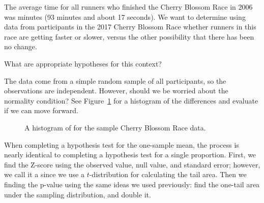 The average time for all runners who finished the Cherry Blossom Race in 2006 was \cherryblossomnull{} minutes (93 minutes and about 17 seconds). We want to determine using data from \cherryblossomn{} participants in the 2017 Cherry Blossom Race whether runners in this race are getting faster or slower, versus the other possibility that there has been no change.

\begin{exercisewrap}
\begin{nexercise}
What are appropriate hypotheses for this context?\footnotemark{}
\end{nexercise}
\end{exercisewrap}

\begin{exercisewrap}
\begin{nexercise}
The data come from a simple random sample of all participants,
so the observations are independent.
However, should we be worried about the normality condition?
See Figure~\ref{run10SampTimeHistogram} for a histogram
of the differences and evaluate if we can move
forward.\footnotemark{}
\end{nexercise}
\end{exercisewrap}

\begin{figure}[h]
  \centering
  \caption{A histogram of  for the sample
      Cherry Blossom Race data.}
  \label{run10SampTimeHistogram}
\end{figure}

When completing a hypothesis test for the one-sample mean,
the process is nearly identical to completing a hypothesis
test for a single proportion.
First, we find the Z-score using the observed value,
null value, and standard error;
however, we call it a  since we use
a $t$-distribution for calculating the tail area.
Then we finding the p-value using the same ideas we used
previously: find the one-tail area under the sampling
distribution, and double it.

